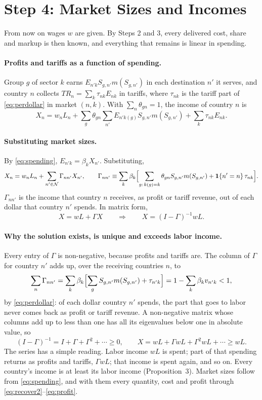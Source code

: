 \documentclass[11pt]{article}
\newcommand{\cN}{\mathcal N}
\newcommand{\TR}{\mathit{TR}}
\begin{document}
\section{Step 4: Market Sizes and Incomes}
\label{sec:incomes}

From now on wages $w$ are given. By Steps 2 and 3, every delivered cost, share and
markup is then known, and everything that remains is linear in spending.

\paragraph{Profits and tariffs as a function of spending.} Group $g$ of sector $k$
earns $E_{n'k}S_{g,n'}m(S_{g,n'})$ in each destination $n'$ it serves, and country $n$
collects $\TR_n=\sum_k\tau_{nk}E_{nk}$ in tariffs, where $\tau_{nk}$ is the tariff part
of \eqref{eq:perdollar} in market $(n,k)$. With $\sum_n\theta_{gn}=1$, the income of
country $n$ is
\[
  X_n=w_nL_n+\sum_g\theta_{gn}\sum_{n'}E_{n'k(g)}S_{g,n'}m(S_{g,n'})+\sum_k\tau_{nk}E_{nk}.
\]

\paragraph{Substituting market sizes.} By \eqref{eq:spending}, $E_{n'k}=\beta_kX_{n'}$.
Substituting,
\begin{equation}
  X_n=w_nL_n+\sum_{n'\in\cN}\Gamma_{nn'}X_{n'},
  \qquad
  \Gamma_{nn'}\equiv\sum_k\beta_k\Bigl[\sum_{g:\,k(g)=k}\theta_{gn}S_{g,n'}m(S_{g,n'})
  +\mathbf 1\{n'=n\}\,\tau_{nk}\Bigr].
  \label{eq:incomesys}
\end{equation}
$\Gamma_{nn'}$ is the income that country $n$ receives, as profit or tariff revenue, out
of each dollar that country $n'$ spends. In matrix form,
\begin{equation}
  X=wL+\Gamma X
  \qquad\Longrightarrow\qquad
  X=(I-\Gamma)^{-1}wL .
  \label{eq:XofW}
\end{equation}

\paragraph{Why the solution exists, is unique and exceeds labor income.} Every entry of
$\Gamma$ is non-negative, because profits and tariffs are. The column of $\Gamma$ for
country $n'$ adds up, over the receiving countries $n$, to
\[
  \sum_n\Gamma_{nn'}=\sum_k\beta_k\Bigl[\sum_gS_{g,n'}m(S_{g,n'})+\tau_{n'k}\Bigr]
  =1-\sum_k\beta_kv_{n'k}<1,
\]
by \eqref{eq:perdollar}: of each dollar country $n'$ spends, the part that goes to labor
never comes back as profit or tariff revenue. A non-negative matrix whose columns add
up to less than one has all its eigenvalues below one in absolute value, so
\[
  (I-\Gamma)^{-1}=I+\Gamma+\Gamma^2+\cdots\ge0,
  \qquad
  X=wL+\Gamma wL+\Gamma^2wL+\cdots\ge wL .
\]
The series has a simple reading. Labor income $wL$ is spent; part of that spending
returns as profits and tariffs, $\Gamma wL$; that income is spent again, and so on. Every
country's income is at least its labor income (Proposition~3). Market sizes follow from
\eqref{eq:spending}, and with them every quantity, cost and profit through
\eqref{eq:recover2}--\eqref{eq:profit}.
\end{document}
